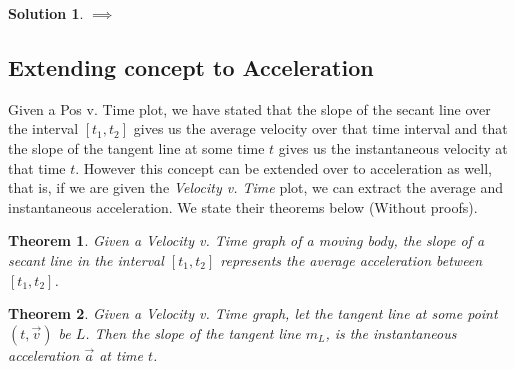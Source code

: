 \documentclass[12pt]{article}
\theoremstyle{break}
\newtheorem{thm}{Theorem}[subsection]
\newtheorem*{soln}{Solution}
\begin{document}
\begin{soln}
$\implies$

\vspace*{4cm}
\end{soln}
\subsection{Extending concept to Acceleration}
Given a Pos v. Time plot, we have stated that the slope of the secant line over the interval $[t_1,t_2]$ gives us the average velocity over that time interval and that the slope of the tangent line at some time $t$ gives us the instantaneous velocity at that time $t$. However this concept can be extended over to acceleration as well, that is, if we are given the \emph{Velocity v. Time} plot, we can extract the average and instantaneous acceleration. We state their theorems below (Without proofs).
\begin{thm}
	Given a Velocity v. Time graph of a moving body, the slope of a secant line in the interval $[t_1,t_2]$ represents the average acceleration between $[t_1,t_2]$.
\end{thm}

\begin{thm}
	Given a Velocity v. Time graph, let the tangent line at some point $(t, \vec v)$ be $L$. Then the slope of the tangent line $m_L$, is the instantaneous acceleration $\vec a$ at time $t$.
\end{thm}
\end{document}
